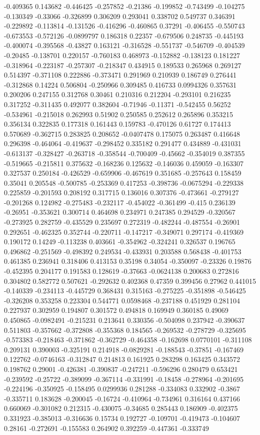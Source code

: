 -0.409365 0.143682 -0.446425 -0.257852 -0.21386 -0.199852 -0.743499 -0.104275 -0.130349 -0.33066 -0.326899 0.306209 0.293041 0.338702 0.549737 0.346391 -0.229892 -0.113814 -0.131526 -0.416296 -0.460865 0.37291 -0.406455 -0.550743 -0.673553 -0.572126 -0.0899797 0.186318 0.22357 -0.679506 0.248735 -0.445193 -0.400074 -0.395568 -0.43827 0.163121 -0.316528 -0.551737 -0.546709 -0.404539 -0.20485 -0.138701 0.220157 -0.760183 0.468973 -0.152882 -0.138123 0.181227 -0.318964 -0.223187 -0.257307 -0.218347 0.434915 0.189533 0.265968 0.269127 0.514397 -0.371108 0.222886 -0.373471 0.291969 0.210939 0.186749 0.276441 -0.312868 0.14224 0.506804 -0.250966 0.309485 0.416733 0.0994326 0.357631 0.200206 0.247155 0.312768 0.30461 0.210316 0.212204 -0.293101 0.216235 0.317252 -0.311435 0.492077 0.382604 -0.71946 -0.11371 -0.542455 0.56252 -0.534961 -0.215018 0.262993 0.51902 0.250585 0.252612 0.265896 0.353215 0.356134 0.322835 0.177318 0.161443 0.159783 -0.470126 0.61727 0.174413 0.570689 -0.362715 0.283825 0.208652 -0.0407478 0.175075 0.263487 0.416648 0.296398 -0.464064 -0.419637 -0.298452 0.335182 0.291477 0.434889 -0.431031 -0.613137 -0.328427 -0.263718 -0.358544 -0.700409 -0.45662 -0.354019 0.387355 -0.519665 -0.215811 0.375632 -0.168236 0.125632 -0.146036 0.459059 -0.163307 0.327537 0.250184 -0.426529 -0.659906 -0.467619 0.351685 -0.257643 0.158459 0.35041 0.205548 -0.500785 -0.253369 0.417253 -0.398736 -0.0675294 -0.229338 0.225859 -0.201593 0.208192 0.317715 0.136016 0.307376 -0.473661 -0.279127 -0.201268 0.124982 -0.275483 -0.232117 -0.454022 -0.361499 -0.415 0.236139 -0.26951 -0.353621 0.300714 0.464698 0.234971 0.247385 0.294529 -0.320567 -0.273925 0.282759 -0.435529 0.235697 0.272319 -0.482244 -0.487554 -0.26901 0.292651 -0.462325 0.352744 -0.220711 -0.147217 -0.349071 0.297174 -0.419369 0.190172 0.14249 -0.113238 0.403661 -0.354962 -0.324241 0.326537 0.196765 0.496862 -0.251569 -0.498392 0.249534 -0.433931 0.203588 0.568438 -0.401753 0.461385 0.236941 0.318406 0.413153 0.35198 0.34054 -0.350097 -0.23326 0.19876 -0.452395 0.204177 0.191583 0.128619 -0.37663 -0.0624138 0.200683 0.272816 0.304802 0.582772 0.507621 -0.292632 0.402368 0.47359 0.399456 0.27962 0.441015 -0.140339 -0.234113 -0.445729 0.368431 0.315163 -0.275225 -0.351898 -0.546425 -0.326208 0.353258 0.223304 0.544771 0.0598468 -0.237188 0.451929 0.281104 0.227937 0.302959 0.194807 0.301572 0.494818 0.169949 0.360185 0.49069 0.450865 -0.0982491 -0.215231 0.213641 0.330356 -0.504098 0.237942 -0.390637 0.511803 -0.357662 -0.372808 -0.355368 0.184565 -0.269532 -0.278729 -0.325695 -0.573383 -0.218463 -0.371862 -0.362729 -0.464358 -0.162698 0.0770101 -0.311108 0.209131 0.390003 -0.325191 0.214918 -0.0829281 -0.188543 -0.37851 -0.167469 0.122762 -0.0746163 -0.312847 0.214813 0.161925 0.283298 0.163425 0.343572 0.198762 0.29001 -0.426381 -0.390837 -0.247211 -0.596296 0.280479 0.653421 -0.239592 -0.25722 -0.389099 -0.367114 -0.331991 -0.18458 -0.278964 -0.201695 -0.224196 -0.350925 -0.158495 0.0299936 0.281288 -0.334083 0.332902 -0.3867 -0.335711 0.183628 -0.200045 -0.16724 -0.410964 -0.734961 0.316164 0.437166 0.660069 -0.301082 0.212315 -0.430075 -0.34685 0.285443 0.186909 -0.402375 0.331923 -0.385013 -0.316636 0.15734 0.192727 -0.109701 -0.419473 -0.104607 0.28161 -0.272691 -0.155583 0.264902 0.392259 -0.447361 -0.333749 